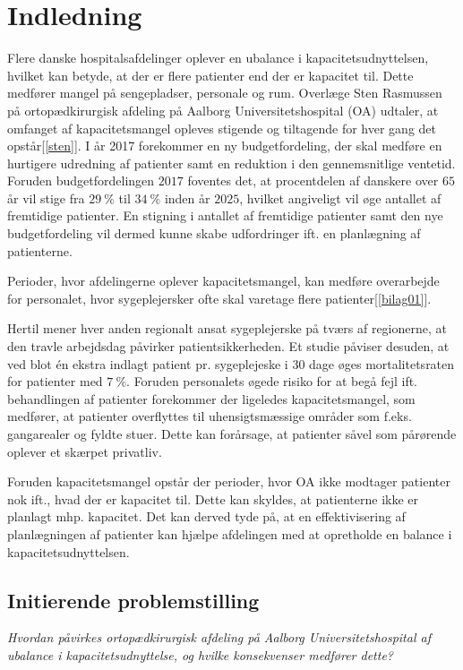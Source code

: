 \chapter{Indledning} \label{indl}
Flere danske hospitalsafdelinger oplever en ubalance i kapacitetsudnyttelsen, hvilket kan betyde, at der er flere patienter end der er kapacitet til. Dette medfører mangel på sengepladser, personale og rum.\cite{Company2013} Overlæge Sten Rasmussen på ortopædkirurgisk afdeling på Aalborg Universitetshospital (OA) udtaler, at omfanget af kapacitetsmangel opleves stigende og tiltagende for hver gang det opstår[\ref{sten}]. I år 2017 forekommer en ny budgetfordeling, der skal medføre en hurtigere udredning af patienter samt en reduktion i den gennemsnitlige ventetid\cite{Budget2016}. 
Foruden budgetfordelingen $2017$ foventes det, at procentdelen af danskere over $65$ år vil stige fra $29~\%$ til $34~\%$ inden år $2025$, hvilket angiveligt vil øge antallet af fremtidige patienter. En stigning i antallet af fremtidige patienter samt den nye budgetfordeling vil dermed kunne skabe udfordringer ift. en planlægning af patienterne.

Perioder, hvor afdelingerne oplever kapacitetsmangel, kan medføre overarbejde for personalet, hvor sygeplejersker ofte skal varetage flere patienter\cite{Danske2015}[\ref{bilag01}]. 

Hertil mener hver anden regionalt ansat sygeplejerske på tværs af regionerne, at den travle arbejdsdag påvirker patientsikkerheden\cite{Kjeldsen2015}. Et studie påviser desuden, at ved blot én ekstra indlagt patient pr. sygeplejeske i 30 dage øges mortalitetsraten for patienter med $7~\%$\cite{Aiken2002}. Foruden personalets øgede risiko for at begå fejl ift. behandlingen af patienter forekommer der ligeledes kapacitetsmangel, som medfører, at patienter overflyttes til uhensigtsmæssige områder som f.eks. gangarealer og fyldte stuer\cite{Madsen2014}. Dette kan forårsage, at patienter såvel som pårørende oplever et skærpet privatliv\cite{Heidmann2014}.

Foruden kapacitetsmangel opstår der perioder, hvor OA ikke modtager patienter nok ift., hvad der er kapacitet til. Dette kan skyldes, at patienterne ikke er planlagt mhp. kapacitet. Det kan derved tyde på, at en effektivisering af planlægningen af patienter kan hjælpe afdelingen med at opretholde en balance i kapacitetsudnyttelsen. 

\section{Initierende problemstilling}
\textit{Hvordan påvirkes ortopædkirurgisk afdeling på Aalborg Universitetshospital af ubalance i kapacitetsudnyttelse, og hvilke konsekvenser medfører dette?}




